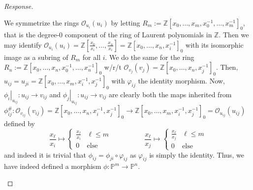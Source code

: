 \documentclass[english,letter,doublesided]{article}
\newcommand{\evat}[3]{\left. #1\right|_{#2}^{#3}}
\newcommand{\ZZ}{\mathbb{Z}}
\newcommand{\OO}{\mathcal{O}}
\newcommand{\PP}{\mathbb{P}}
\theoremstyle{remark}
\theoremstyle{definition}
\newcommand{\restr}[2]{{\evat{#1}{#2}{}}}
\newcommand{\gph}{\varphi}
\newcommand{\fv}[2]{\frac{x_{#1}}{x_{#2}}}
\begin{document}
\begin{proof}[Response]
\begin{enumerate}[label=\textit{(\roman*)}]
	We symmetrize the rings $\OO_{u_i}(u_i)$ by letting $R_m:=\ZZ[x_0,\hdots,x_m,x_0^{-1},\hdots,x_m^{-1}]_0$, that is the degree-0 component of the ring of Laurent polynomials in $\ZZ$. Then we may identify $\OO_{u_i}(u_i)=\ZZ[\fv{0}{i},\hdots,\fv{n}{i}]=\ZZ[x_0,\hdots,x_n,x_i^{-1}]_0$ with its isomorphic image as a subring of $R_m$ for all $i$. We do the same for the ring $R_n:=\ZZ[x_0,\hdots,x_n,x_0^{-1},\hdots,x_n^{-1}]_0$ w/r/t $\OO_{v_j}(v_j)=\ZZ[x_0,\hdots,x_n,x_j^{-1}]_0$. Then, $u_{ij}=u_{ji}=\ZZ[x_0,\hdots,x_m,x_i^{-1},x_j^{-1}]_0$ with $\gph_{ij}$ the identity morphism. Now, $\restr{\phi_i}{u_{ij}}:u_{ij}\to v_{ij}$ and $\restr{\phi_j}{u_{ij}}:u_{ij}\to v_{ij}$ are clearly both the maps inherited from $\phi_{ij}^\#:\OO_{v_{ij}}(v_{ij})= \ZZ[x_0,\hdots,x_n,x_i^{-1},x_j^{-1}]_0\to \ZZ[x_0,\hdots,x_m,x_i^{-1},x_j^{-1}]_0=\OO_{u_{ij}}(u_{ij})$ defined by \begin{equation*}
\fv{\ell}{i}\mapsto \begin{cases}
\fv{\ell}{i}&\ell\leq m\\0&\text{else}
\end{cases}\hspace{2cm}\fv{\ell}{j}\mapsto \begin{cases}
\fv{\ell}{j}&\ell\leq m\\0&\text{else}
\end{cases}
	\end{equation*}
	and indeed it is trivial that $\phi_{ij}=\phi_{ji}\circ \gph_{ij}$ as $\gph_{ij}$ is simply the identity. Thus, we have indeed defined a morphism $\phi:\PP^m\to \PP^n$. 
	

\end{enumerate}
\end{proof}
\end{document}
